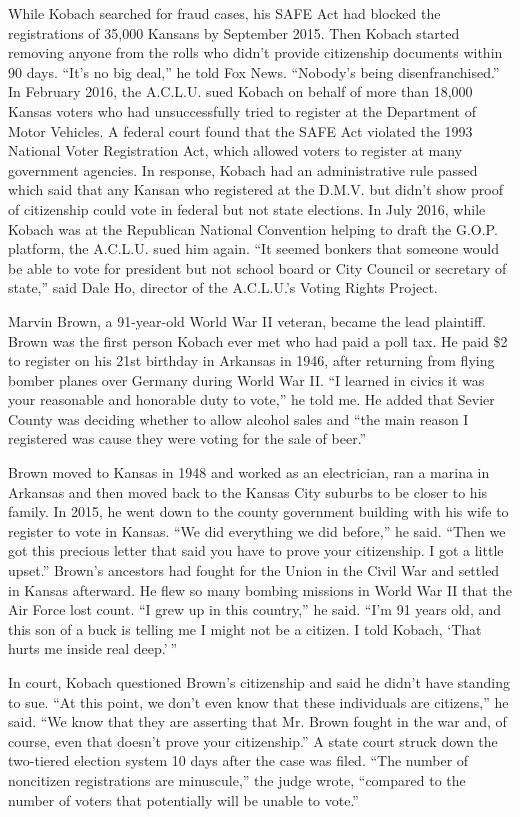 While Kobach searched for fraud cases, his SAFE Act had blocked the
registrations of 35,000 Kansans by September 2015. Then Kobach started
removing anyone from the rolls who didn't provide citizenship documents
within 90 days. ``It's no big deal,'' he told Fox News. ``Nobody's being
disenfranchised.'' In February 2016, the A.C.L.U. sued Kobach on behalf
of more than 18,000 Kansas voters who had unsuccessfully tried to
register at the Department of Motor Vehicles. A federal court found that
the SAFE Act violated the 1993 National Voter Registration Act, which
allowed voters to register at many government agencies. In response,
Kobach had an administrative rule passed which said that any Kansan who
registered at the D.M.V. but didn't show proof of citizenship could vote
in federal but not state elections. In July 2016, while Kobach was at
the Republican National Convention helping to draft the G.O.P. platform,
the A.C.L.U. sued him again. ``It seemed bonkers that someone would be
able to vote for president but not school board or City Council or
secretary of state,'' said Dale Ho, director of the A.C.L.U.'s Voting
Rights Project.

Marvin Brown, a 91-year-old World War II veteran, became the lead
plaintiff. Brown was the first person Kobach ever met who had paid a
poll tax. He paid \$2 to register on his 21st birthday in Arkansas in
1946, after returning from flying bomber planes over Germany during
World War II. ``I learned in civics it was your reasonable and honorable
duty to vote,'' he told me. He added that Sevier County was deciding
whether to allow alcohol sales and ``the main reason I registered was
cause they were voting for the sale of beer.''

Brown moved to Kansas in 1948 and worked as an electrician, ran a marina
in Arkansas and then moved back to the Kansas City suburbs to be closer
to his family. In 2015, he went down to the county government building
with his wife to register to vote in Kansas. ``We did everything we did
before,'' he said. ``Then we got this precious letter that said you have
to prove your citizenship. I got a little upset.'' Brown's ancestors had
fought for the Union in the Civil War and settled in Kansas afterward.
He flew so many bombing missions in World War II that the Air Force lost
count. ``I grew up in this country,'' he said. ``I'm 91 years old, and
this son of a buck is telling me I might not be a citizen. I told
Kobach, `That hurts me inside real deep.' ''

In court, Kobach questioned Brown's citizenship and said he didn't have
standing to sue. ``At this point, we don't even know that these
individuals are citizens,'' he said. ``We know that they are asserting
that Mr. Brown fought in the war and, of course, even that doesn't prove
your citizenship.'' A state court struck down the two-tiered election
system 10 days after the case was filed. ``The number of noncitizen
registrations are minuscule,'' the judge wrote, ``compared to the number
of voters that potentially will be unable to vote.''


